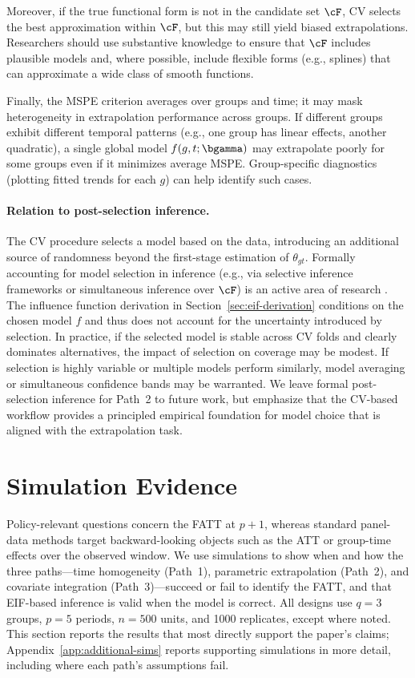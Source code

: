 \documentclass{article}
\begin{document}
Moreover, if the true functional form is not in the candidate set $\cF$, CV selects the best approximation within $\cF$, but this may still yield biased extrapolations. Researchers should use substantive knowledge to ensure that $\cF$ includes plausible models and, where possible, include flexible forms (e.g., splines) that can approximate a wide class of smooth functions.

Finally, the MSPE criterion averages over groups and time; it may mask heterogeneity in extrapolation performance across groups. If different groups exhibit different temporal patterns (e.g., one group has linear effects, another quadratic), a single global model $f(g,t;\bgamma)$ may extrapolate poorly for some groups even if it minimizes average MSPE. Group-specific diagnostics (plotting fitted trends for each $g$) can help identify such cases.

\paragraph{Relation to post-selection inference.}
The CV procedure selects a model based on the data, introducing an additional source of randomness beyond the first-stage estimation of $\theta_{gt}$. Formally accounting for model selection in inference (e.g., via selective inference frameworks or simultaneous inference over $\cF$) is an active area of research \citep{tibshiraniExactPostselectionInference2016,chenValidInferenceModel2021}. The influence function derivation in Section~\ref{sec:eif-derivation} conditions on the chosen model $f$ and thus does not account for the uncertainty introduced by selection. In practice, if the selected model is stable across CV folds and clearly dominates alternatives, the impact of selection on coverage may be modest. If selection is highly variable or multiple models perform similarly, model averaging or simultaneous confidence bands may be warranted. We leave formal post-selection inference for Path~2 to future work, but emphasize that the CV-based workflow provides a principled empirical foundation for model choice that is aligned with the extrapolation task.

\section{Simulation Evidence}\label{sec:simulations}

Policy-relevant questions concern the FATT at $p+1$, whereas standard panel-data methods target backward-looking objects such as the ATT or group-time effects over the observed window. We use simulations to show when and how the three paths---time homogeneity (Path~1), parametric extrapolation (Path~2), and covariate integration (Path~3)---succeed or fail to identify the FATT, and that EIF-based inference is valid when the model is correct. All designs use $q=3$ groups, $p=5$ periods, $n=500$ units, and 1000 replicates, except where noted. This section reports the results that most directly support the paper's claims; Appendix~\ref{app:additional-sims} reports supporting simulations in more detail, including where each path's assumptions fail.
\end{document}
